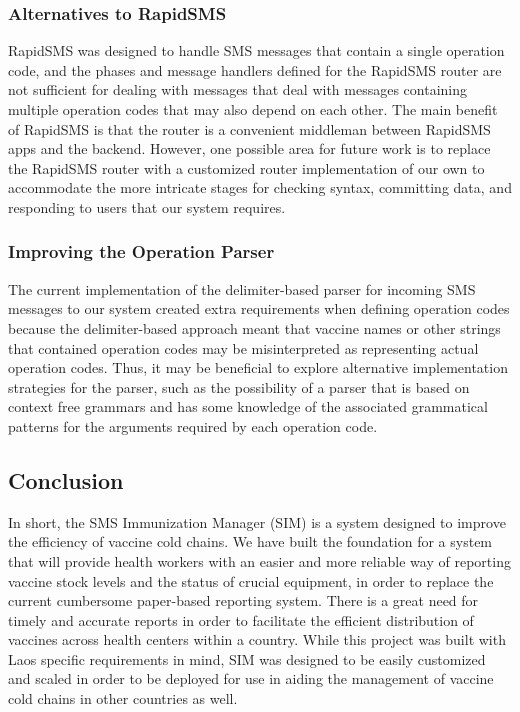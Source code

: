 \documentclass{acm_proc_article-sp}
\begin{document}
\subsubsection{Alternatives to RapidSMS}

RapidSMS was designed to handle SMS messages that contain a single operation code, and the phases and message handlers defined for the RapidSMS router are not sufficient for dealing with messages that deal with messages containing multiple operation codes that may also depend on each other. The main benefit of RapidSMS is that the router is a convenient middleman between RapidSMS apps and the backend. However, one possible area for future work is to replace the RapidSMS router with a customized router implementation of our own to accommodate the more intricate stages for checking syntax, committing data, and responding to users that our system requires. 

\subsubsection{Improving the Operation Parser}

The current implementation of the delimiter-based parser for incoming SMS messages to our system created extra requirements when defining operation codes because the delimiter-based approach meant that vaccine names or other strings that contained operation codes may be misinterpreted as representing actual operation codes. Thus, it may be beneficial to explore alternative implementation strategies for the parser, such as the possibility of a parser that is based on context free grammars and has some knowledge of the associated grammatical patterns for the arguments required by each operation code.

\subsection{Conclusion}

In short, the SMS Immunization Manager (SIM) is a system designed to improve the efficiency of vaccine cold chains. We have built the foundation for a system that will provide health workers with an easier and more reliable way of reporting vaccine stock levels and the status of crucial equipment, in order to replace the current cumbersome paper-based reporting system. There is a great need for timely and accurate reports in order to facilitate the efficient distribution of vaccines across health centers within a country. While this project was built with Laos specific requirements in mind, SIM was designed to be easily customized and scaled in order to be deployed for use in aiding the management of vaccine cold chains in other countries as well.  
\end{document}
